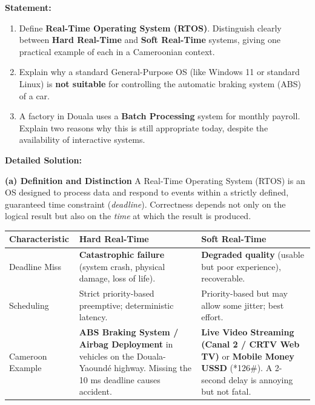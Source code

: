 \documentclass[11pt]{article}
\newcommand{\cle}[1]{{\popxbold\color{popdark}#1}}
\begin{document}
\begin{exoresolu}
\textbf{Statement:}
\begin{enumerate}
    \item Define \textbf{Real-Time Operating System (RTOS)}. Distinguish clearly between \textbf{Hard Real-Time} and \textbf{Soft Real-Time} systems, giving one practical example of each in a Cameroonian context.
    \item Explain why a standard General-Purpose OS (like Windows 11 or standard Linux) is \textbf{not suitable} for controlling the automatic braking system (ABS) of a car.
    \item A factory in Douala uses a \textbf{Batch Processing} system for monthly payroll. Explain two reasons why this is still appropriate today, despite the availability of interactive systems.
\end{enumerate}
\tcblower
\textbf{Detailed Solution:}

\noindent\textbf{(a) Definition and Distinction}
A \cle{Real-Time Operating System (RTOS)} is an OS designed to process data and respond to events within a strictly defined, guaranteed time constraint (\emph{deadline}). Correctness depends not only on the logical result but also on the \emph{time} at which the result is produced.

\begin{center}
\begin{tabularx}{\linewidth}{|l|X|X|}
\hline
\rowcolor{popblueL}
\textbf{Characteristic} & \textbf{Hard Real-Time} & \textbf{Soft Real-Time} \\
\hline
Deadline Miss & \textbf{Catastrophic failure} (system crash, physical damage, loss of life). & \textbf{Degraded quality} (usable but poor experience), recoverable. \\
\hline
Scheduling & Strict priority-based preemptive; deterministic latency. & Priority-based but may allow some jitter; best effort. \\
\hline
Cameroon Example & \textbf{ABS Braking System / Airbag Deployment} in vehicles on the Douala-Yaoundé highway. Missing the 10 ms deadline causes accident. & \textbf{Live Video Streaming (Canal 2 / CRTV Web TV)} or \textbf{Mobile Money USSD} (*126\#). A 2-second delay is annoying but not fatal. \\
\hline
\end{tabularx}
\end{center}


\end{exoresolu}
\end{document}
